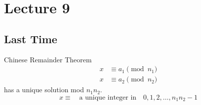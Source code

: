 \chapter{Lecture 9}
\date{September 24, 2024}

\section{Last Time}
    Chinese Remainder Theorem
    \begin{align*}
        x &\equiv a_1\pmod{n_1} \\
        x &\equiv a_2\pmod{n_2}
    \end{align*}
    has a unique solution mod $n_1n_2$. 
    \[ x\equiv\quad\text{a unique integer in}\quad 0,1,2,\dots,n_1n_2-1 \]